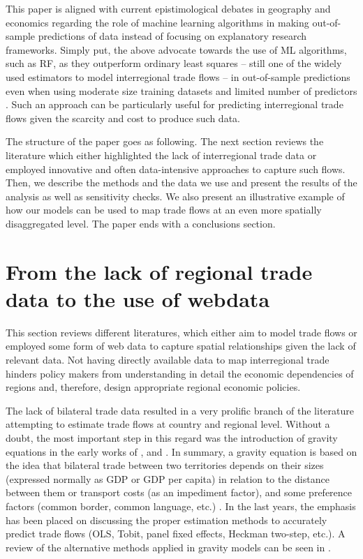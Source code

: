 \documentclass[]{interact}
\theoremstyle{plain}%
\theoremstyle{definition}
\theoremstyle{remark}
\begin{document}
This paper is aligned with current epistimological debates in geography
\citep{singleton2021geographic, creditspatial} and economics
\citep{kleinberg2015prediction} regarding the role of machine learning
algorithms in making out-of-sample predictions of data instead of
focusing on explanatory research frameworks. Simply put, the above
advocate towards the use of ML algorithms, such as RF, as they
outperform ordinary least squares -- still one of the widely used
estimators to model interregional trade flows -- in out-of-sample
predictions even when using moderate size training datasets and limited
number of predictors \citep{mullainathan2017machine, athey2019machine}.
Such an approach can be particularly useful for predicting interregional
trade flows given the scarcity and cost to produce such data.

The structure of the paper goes as following. The next section reviews
the literature which either highlighted the lack of interregional trade
data or employed innovative and often data-intensive approaches to
capture such flows. Then, we describe the methods and the data we use
and present the results of the analysis as well as sensitivity checks.
We also present an illustrative example of how our models can be used to
map trade flows at an even more spatially disaggregated level. The paper
ends with a conclusions section.

\hypertarget{sec:2}{%
\section{From the lack of regional trade data to the use of
webdata}\label{sec:2}}

This section reviews different literatures, which either aim to model
trade flows or employed some form of web data to capture spatial
relationships given the lack of relevant data. Not having directly
available data to map interregional trade hinders policy makers from
understanding in detail the economic dependencies of regions and,
therefore, design appropriate regional economic policies.

The lack of bilateral trade data resulted in a very prolific branch of
the literature attempting to estimate trade flows at country and
regional level. Without a doubt, the most important step in this regard
was the introduction of gravity equations in the early works of
\citet{tinbergen1962shaping}, \citet{linnemann1966econometric} and
\citet{leamer1r}. In summary, a gravity equation is based on the idea
that bilateral trade between two territories depends on their sizes
(expressed normally as GDP or GDP per capita) in relation to the
distance between them or transport costs (as an impediment factor), and
some preference factors (common border, common language, etc.)
\citep{egger2002econometric, anderson2003gravity}. In the last years,
the emphasis has been placed on discussing the proper estimation methods
to accurately predict trade flows (OLS, Tobit, panel fixed effects,
Heckman two-step, etc.). A review of the alternative methods applied in
gravity models can be seen in \citet{gomez2013comparing}.
\end{document}

